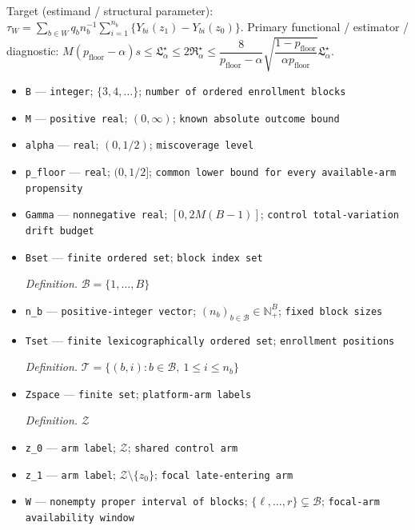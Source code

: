 \documentclass{article}
\begin{document}
Target (estimand / structural parameter): \(\tau_W=\sum_{b\in W}q_b n_b^{-1}\sum_{i=1}^{n_b}\{Y_{bi}(z_1)-Y_{bi}(z_0)\}\).
Primary functional / estimator / diagnostic: \(M(p_{\mathrm{floor}}-\alpha)s\le \mathfrak L_\alpha^\star\le2\mathfrak R_\alpha^\star\le \dfrac{8}{p_{\mathrm{floor}}-\alpha}\sqrt{\dfrac{1-p_{\mathrm{floor}}}{\alpha p_{\mathrm{floor}}}}\mathfrak L_\alpha^\star\).
\begin{itemize}
  \item \texttt{B} --- \texttt{integer}; \(\{3,4,\ldots\}\); \texttt{number of ordered enrollment blocks}
  \item \texttt{M} --- \texttt{positive real}; \((0,\infty)\); \texttt{known absolute outcome bound}
  \item \texttt{alpha} --- \texttt{real}; \((0,1/2)\); \texttt{miscoverage level}
  \item \texttt{p\_\allowbreak{}floor} --- \texttt{real}; \((0,1/2]\); \texttt{common lower bound for every available-\allowbreak{}arm propensity}
  \item \texttt{Gamma} --- \texttt{nonnegative real}; \([0,2M(B-1)]\); \texttt{control total-\allowbreak{}variation drift budget}
  \item \texttt{Bset} --- \texttt{finite ordered set}; \texttt{block index set}
  \par\smallskip\noindent\emph{Definition.} \(\mathcal B=\{1,\ldots,B\}\)
  \item \texttt{n\_\allowbreak{}b} --- \texttt{positive-\allowbreak{}integer vector}; \((n_b)_{b\in\mathcal B}\in\mathbb N_+^B\); \texttt{fixed block sizes}
  \item \texttt{Tset} --- \texttt{finite lexicographically ordered set}; \texttt{enrollment positions}
  \par\smallskip\noindent\emph{Definition.} \(\mathcal T=\{(b,i):b\in\mathcal B,\ 1\le i\le n_b\}\)
  \item \texttt{Zspace} --- \texttt{finite set}; \texttt{platform-\allowbreak{}arm labels}
  \par\smallskip\noindent\emph{Definition.} \(\mathcal Z\)
  \item \texttt{z\_\allowbreak{}0} --- \texttt{arm label}; \(\mathcal Z\); \texttt{shared control arm}
  \item \texttt{z\_\allowbreak{}1} --- \texttt{arm label}; \(\mathcal Z\setminus\{z_0\}\); \texttt{focal late-\allowbreak{}entering arm}
  \item \texttt{W} --- \texttt{nonempty proper interval of blocks}; \(\{\ell,\ldots,r\}\subsetneq\mathcal B\); \texttt{focal-\allowbreak{}arm availability window}

\end{itemize}
\end{document}
